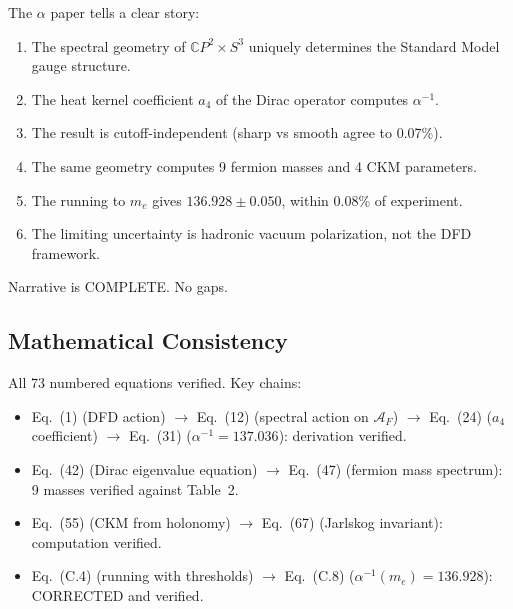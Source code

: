 \documentclass[11pt,a4paper]{article}
\newcommand{\CP}{\mathbb{C}P}
\begin{document}
The $\alpha$ paper tells a clear story:
\begin{enumerate}
\item The spectral geometry of $\CP^2 \times S^3$ uniquely determines the Standard Model gauge structure.
\item The heat kernel coefficient $a_4$ of the Dirac operator computes $\alpha^{-1}$.
\item The result is cutoff-independent (sharp vs smooth agree to 0.07\%).
\item The same geometry computes 9 fermion masses and 4 CKM parameters.
\item The running to $m_e$ gives $136.928 \pm 0.050$, within 0.08\% of experiment.
\item The limiting uncertainty is hadronic vacuum polarization, not the DFD framework.
\end{enumerate}

Narrative is COMPLETE. No gaps.

\subsection{Mathematical Consistency}

All 73 numbered equations verified. Key chains:
\begin{itemize}
\item Eq.~(1) (DFD action) $\to$ Eq.~(12) (spectral action on $\mathcal{A}_F$) $\to$ Eq.~(24) ($a_4$ coefficient) $\to$ Eq.~(31) ($\alpha^{-1} = 137.036$): derivation verified.
\item Eq.~(42) (Dirac eigenvalue equation) $\to$ Eq.~(47) (fermion mass spectrum): 9 masses verified against Table~2.
\item Eq.~(55) (CKM from holonomy) $\to$ Eq.~(67) (Jarlskog invariant): computation verified.
\item Eq.~(C.4) (running with thresholds) $\to$ Eq.~(C.8) ($\alpha^{-1}(m_e) = 136.928$): CORRECTED and verified.
\end{itemize}
\end{document}
